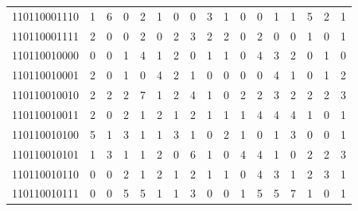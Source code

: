 \documentclass[10pt,a4paper]{article}
\begin{document}
\begin{longtable}{ |c|c|c|c|c|c|c|c|c|c|c|c|c|c|c|c|c| }
    110110001110              & 1                            & 6                                & 0                            & 2                              & 1   & 0   & 0   & 3   & 1   & 0   & 0   & 1   & 1   & 5   & 2   & 1   \\
    110110001111              & 2                            & 0                                & 0                            & 2                              & 0   & 2   & 3   & 2   & 2   & 0   & 2   & 0   & 0   & 1   & 0   & 1   \\
    110110010000              & 0                            & 0                                & 1                            & 4                              & 1   & 2   & 0   & 1   & 1   & 0   & 4   & 3   & 2   & 0   & 1   & 0   \\
    110110010001              & 2                            & 0                                & 1                            & 0                              & 4   & 2   & 1   & 0   & 0   & 0   & 0   & 4   & 1   & 0   & 1   & 2   \\
    110110010010              & 2                            & 2                                & 2                            & 7                              & 1   & 2   & 4   & 1   & 0   & 2   & 2   & 3   & 2   & 2   & 2   & 3   \\
    110110010011              & 2                            & 0                                & 2                            & 1                              & 2   & 1   & 2   & 1   & 1   & 1   & 4   & 4   & 4   & 1   & 0   & 1   \\
    110110010100              & 5                            & 1                                & 3                            & 1                              & 1   & 3   & 1   & 0   & 2   & 1   & 0   & 1   & 3   & 0   & 0   & 1   \\
    110110010101              & 1                            & 3                                & 1                            & 1                              & 2   & 0   & 6   & 1   & 0   & 4   & 4   & 1   & 0   & 2   & 2   & 3   \\
    110110010110              & 0                            & 0                                & 2                            & 1                              & 2   & 1   & 2   & 1   & 1   & 0   & 4   & 3   & 1   & 2   & 3   & 1   \\
    110110010111              & 0                            & 0                                & 5                            & 5                              & 1   & 1   & 3   & 0   & 0   & 1   & 5   & 5   & 7   & 1   & 0   & 1   \\

\end{longtable}
\end{document}
